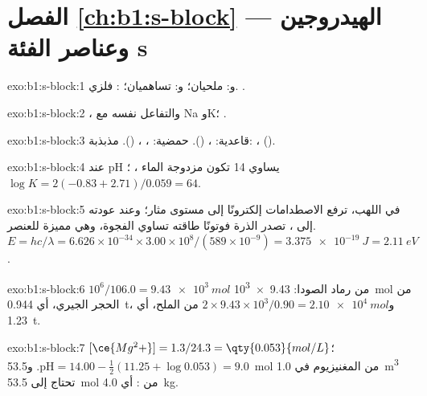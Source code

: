 \section*{الفصل \ref{ch:b1:s-block} --- الهيدروجين وعناصر الفئة s}

\begin{solution}{exo:b1:s-block:1}
 و: ملحيان؛  و: تساهميان؛
: فلزي. .
\end{solution}

\begin{solution}{exo:b1:s-block:2}
، والتفاعل نفسه مع Na وK؛
.
\end{solution}

\begin{solution}{exo:b1:s-block:3}
قاعدية: ،  (). حمضية:
، ،  (). مذبذبة:
،  ().
\end{solution}

\begin{solution}{exo:b1:s-block:4}
عند pH يساوي 14 تكون مزدوجة الماء ، ؛
$\log K = 2(-0.83 + 2.71)/0.059 = 64$.
\end{solution}

\begin{solution}{exo:b1:s-block:5}
في اللهب، ترفع الاصطدامات إلكترونًا إلى مستوى مثار؛ وعند عودته
إلى ، تصدر الذرة فوتونًا طاقته تساوي الفجوة،
وهي مميزة للعنصر. $E = hc/\lambda = 6.626 \times 10^{-34} \times
3.00 \times 10^8/(589 \times 10^{-9}) = \qty{3.375e-19}{J} = \qty{2.11}{eV}$.
\end{solution}

\begin{solution}{exo:b1:s-block:6}
$10^6/106.0 = \qty{9.43e3}{mol}$ من رماد الصودا: \qty{9.43e3}{mol} من
الحجر الجيري، أي \qty{0.944}{t}، و$2 \times 9.43 \times 10^3/0.90 =
\qty{2.10e4}{mol}$ من الملح، أي \qty{1.23}{t}.
\end{solution}

\begin{solution}{exo:b1:s-block:7}
$[\ce{Mg^2+}] = 1.3/24.3 = \qty{0.053}{mol/L}$؛ $\mathrm{pH} = 14.00 -
\frac12(11.25 + \log 0.053) = 9.0$. و\qty{53.5}{mol} من المغنيزيوم في
\qty{1.0}{m^3} تحتاج إلى \qty{53.5}{mol} من : أي \qty{4.0}{kg}.
\end{solution}


